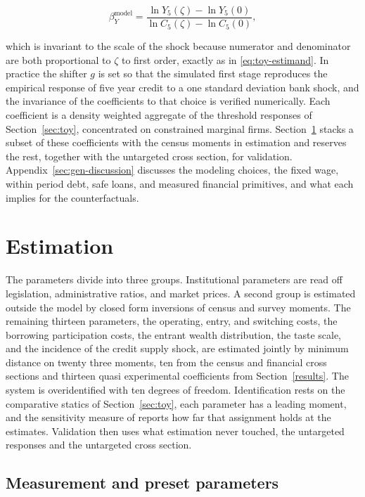 \documentclass[12pt]{article}
\begin{document}
\begin{equation}
  \beta^{\mathrm{model}}_{Y}
  =\frac{\ln Y_{5}(\zeta)-\ln Y_{5}(0)}{\ln C_{5}(\zeta)-\ln C_{5}(0)},
  \label{eq:gen-beta}
\end{equation}

which is invariant to the scale of the shock because numerator and denominator are both proportional to $\zeta$ to first order, exactly as in \eqref{eq:toy-estimand}. In practice the shifter $g$ is set so that the simulated first stage reproduces the empirical response of five year credit to a one standard deviation bank shock, and the invariance of the coefficients to that choice is verified numerically. Each coefficient is a density weighted aggregate of the threshold responses of Section~\ref{sec:toy}, concentrated on constrained marginal firms. Section~\ref{sec:estimation} stacks a subset of these coefficients with the census moments in estimation and reserves the rest, together with the untargeted cross section, for validation. Appendix~\ref{sec:gen-discussion} discusses the modeling choices, the fixed wage, within period debt, safe loans, and measured financial primitives, and what each implies for the counterfactuals.

\section{Estimation}
\label{sec:estimation}

The parameters divide into three groups. Institutional parameters are read off legislation, administrative ratios, and market prices. A second group is estimated outside the model by closed form inversions of census and survey moments. The remaining thirteen parameters, the operating, entry, and switching costs, the borrowing participation costs, the entrant wealth distribution, the taste scale, and the incidence of the credit supply shock, are estimated jointly by minimum distance on twenty three moments, ten from the census and financial cross sections and thirteen quasi experimental coefficients from Section~\ref{results}. The system is overidentified with ten degrees of freedom. Identification rests on the comparative statics of Section~\ref{sec:toy}, each parameter has a leading moment, and the sensitivity measure of \citet{andrews2017measuring} reports how far that assignment holds at the estimates. Validation then uses what estimation never touched, the untargeted responses and the untargeted cross section.

\subsection{Measurement and preset parameters}
\label{sec:est-presets}
\end{document}
